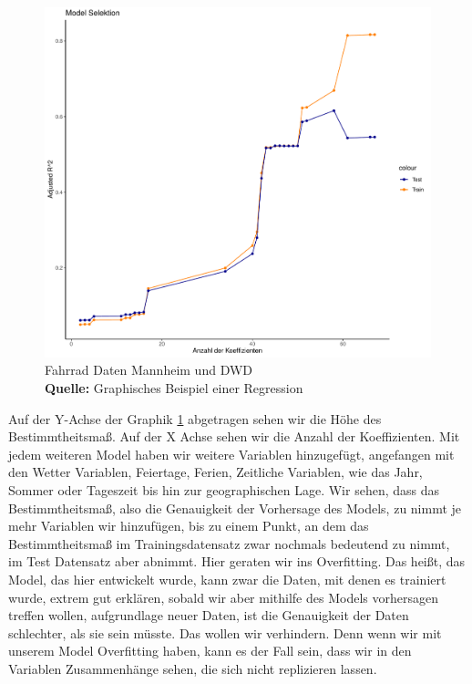 \documentclass[a4paper,12pt]{thesis}
\newcommand*{\captionsource}[2]{%
	\caption[{#1}]{%
		#1%
		\\\hspace{\linewidth}%
		\textbf{Quelle:} #2%
	}%
}
\begin{document}
\begin{figure}[]
	\centering
	\includegraphics[width=\textwidth]{Plots/ModelSelektion1.pdf}
	\captionsource{Fahrrad Daten Mannheim und DWD}{
		Graphisches Beispiel einer Regression
	}
	\label{ModelSelektion}
\end{figure}

Auf der Y-Achse der Graphik \ref{ModelSelektion} abgetragen sehen wir die Höhe des Bestimmtheitsmaß. Auf der X Achse sehen wir die Anzahl der Koeffizienten. Mit jedem weiteren Model haben wir weitere Variablen hinzugefügt, angefangen mit den Wetter Variablen, Feiertage, Ferien, Zeitliche Variablen, wie das Jahr, Sommer oder Tageszeit bis hin zur geographischen Lage. Wir sehen, dass das Bestimmtheitsmaß, also die Genauigkeit der Vorhersage des Models, zu nimmt je mehr Variablen wir hinzufügen, bis zu einem Punkt, an dem das Bestimmtheitsmaß im Trainingsdatensatz zwar nochmals bedeutend zu nimmt, im Test Datensatz aber abnimmt. Hier geraten wir ins Overfitting. Das heißt, das Model, das hier entwickelt wurde, kann zwar die Daten, mit denen es trainiert wurde, extrem gut erklären, sobald wir aber mithilfe des Models vorhersagen treffen wollen, aufgrundlage neuer Daten, ist die Genauigkeit der Daten schlechter, als sie sein müsste. Das wollen wir verhindern. Denn wenn wir mit unserem Model Overfitting haben, kann es der Fall sein, dass wir in den Variablen Zusammenhänge sehen, die sich nicht replizieren lassen.\\
\end{document}
